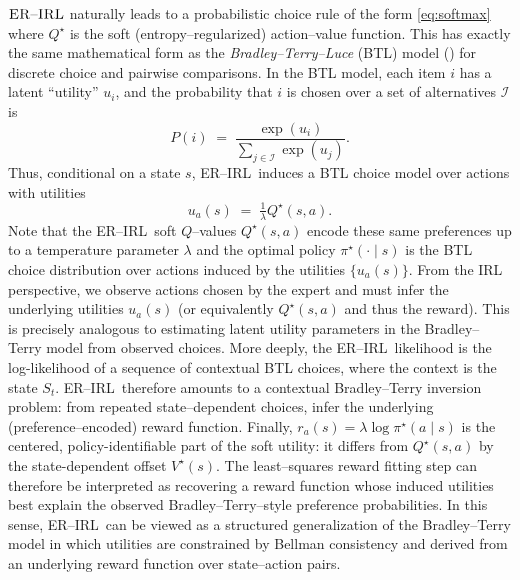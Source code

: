 \documentclass{article}
\theoremstyle{definition}
\theoremstyle{remark}
\theoremstyle{plain}
\newcommand{\ERIRL}{\textsc{ER--IRL}}
\numberwithin{equation}{section}
\begin{document}
\(\ERIRL\) naturally leads to a probabilistic choice rule of the 
form \eqref{eq:softmax}
where $Q^\star$ is the soft (entropy--regularized) action--value function.
This has exactly the same mathematical form as the
\emph{Bradley--Terry--Luce} (BTL) model (\cite{BradleyTerry}) for discrete choice and pairwise
comparisons.  
In the BTL model, each item $i$ has a latent ``utility'' $u_i$, and the probability 
that $i$ is chosen over a set of alternatives $\mathcal{I}$ is
\[
    P(i)
    \;=\;
    \frac{\exp(u_i)}{\sum_{j\in\mathcal{I}} \exp(u_j)}.
\]
Thus, conditional on a state $s$, \ERIRL\, induces a BTL choice model over actions
with utilities
\[
    u_a(s)
    \;=\;
    \tfrac{1}{\lambda} Q^\star(s,a).
\]
Note that  the \ERIRL\, soft $Q$--values $Q^\star(s,a)$ encode these same preferences
    up to a temperature parameter $\lambda$
    and the optimal policy $\pi^\star(\cdot\mid s)$ is the BTL choice
    distribution over actions induced by the utilities $\{u_a(s)\}$.
From the IRL perspective, we observe actions chosen by the expert and must infer
the underlying utilities $u_a(s)$ (or equivalently $Q^\star(s,a)$ and thus the
reward).  
This is precisely analogous to estimating latent utility parameters in the
Bradley--Terry model from observed choices.
More deeply, the \ERIRL\, likelihood
is the log-likelihood of a sequence of contextual BTL choices, where the
context is the state $S_t$.  
\ERIRL\, therefore amounts to a contextual Bradley--Terry inversion 
problem: from repeated state--dependent choices, infer the underlying 
(preference--encoded) reward function. Finally, $r_a(s)=\lambda\log\pi^\star(a\mid s)$ is the centered, policy-identifiable part of the soft utility: it differs from $Q^\star(s,a)$ by the state-dependent offset $V^\star(s)$. The least--squares reward fitting step can therefore be interpreted as 
recovering a reward function whose induced utilities best explain the observed 
Bradley--Terry--style preference probabilities.
In this sense, \ERIRL\, can be viewed as a structured generalization of
the Bradley--Terry model in which utilities are constrained by Bellman
consistency and derived from an underlying reward function over state--action 
pairs.





\end{document}
